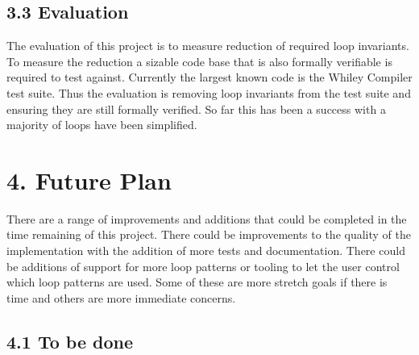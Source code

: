 \documentclass[11pt, a4paper, twoside, openright]{report}
\begin{document}
\subsection*{3.3 Evaluation}

The evaluation of this project is to measure reduction of required loop
invariants.
To measure the reduction a sizable code base that is also formally verifiable
is required to test against.
Currently the largest known code is the Whiley Compiler test suite.
Thus the evaluation is removing loop invariants from the test suite and
ensuring they are still formally verified.
So far this has been a success with a majority of loops have been simplified.

\section*{4. Future Plan}

There are a range of improvements and additions that could be completed in
the time remaining of this project.
There could be improvements to the quality of the implementation with
the addition of more tests and documentation.
There could be additions of support for more loop patterns or tooling
to let the user control which loop patterns are used.
Some of these are more stretch goals if there is time and
others are more immediate concerns.

\subsection*{4.1 To be done}
\end{document}
